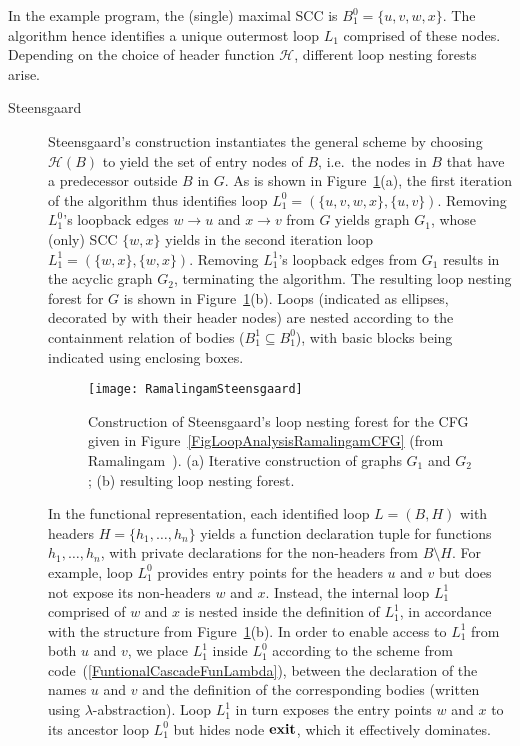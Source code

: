 In the example program, the (single) maximal SCC is $B^0_1 = \{u, v,
w, x\}$.  The algorithm hence identifies a unique outermost loop $L_1$
comprised of these nodes.  Depending on the choice of header function
$\mathcal{H}$, different loop nesting forests arise.

\begin{description}

\item[Steensgaard] Steensgaard's construction instantiates the general
  scheme by choosing $\mathcal{H}(B)$ to yield the set of entry nodes
  of $B$, i.e.~the nodes in $B$ that have a predecessor outside $B$ in
  $G$. As is shown in
  Figure~\ref{FigLoopAnalysisRamalingamSteensgaard}(a), the first
  iteration of the algorithm thus identifies loop $L^0_1=(\{u,v,w,x\},
  \{u,v\})$.  Removing $L^0_1$'s loopback edges $w \to u$ and $x \to
  v$ from $G$ yields graph $G_1$, whose (only) SCC $\{w,x\}$ yields in
  the second iteration loop $L^1_1 = (\{w,x\}, \{w,x\})$.  Removing
  $L^1_1$'s loopback edges from $G_1$ results in the acyclic graph
  $G_2$, terminating the algorithm.  The resulting loop nesting forest
  for $G$ is shown in
  Figure~\ref{FigLoopAnalysisRamalingamSteensgaard}(b).  Loops
  (indicated as ellipses, decorated by with their header nodes) are
  nested according to the containment relation of bodies ($B^1_1
  \subseteq B^0_1$), with basic blocks being indicated using enclosing
  boxes.

  \begin{figure}
    \begin{center}
    \texttt{[image: RamalingamSteensgaard]}
    \end{center}
    \caption{\label{FigLoopAnalysisRamalingamSteensgaard} Construction
       of Steensgaard's loop nesting forest for the CFG given in
       Figure~\ref{FigLoopAnalysisRamalingamCFG} (from
       Ramalingam~\cite{DBLP:journals/toplas/Ramalingam02}). 
       (a) Iterative construction of graphs $G_1$ and $G_2$; 
       (b) resulting loop nesting forest.}
  \end{figure} 

  In the functional representation, each identified loop $L=(B,H)$
  with headers $H=\{h_1,\ldots,h_n\}$ yields a function declaration
  tuple for functions $h_1,\ldots,h_n$, with private declarations for
  the non-headers from $B \setminus H$. For example, loop $L^0_1$
  provides entry points for the headers $u$ and $v$ but does not
  expose its non-headers $w$ and $x$.  Instead, the internal loop
  $L^1_1$ comprised of $w$ and $x$ is nested inside the definition of
  $L^1_1$, in accordance with the structure from
  Figure~\ref{FigLoopAnalysisRamalingamSteensgaard}(b).  In order to
  enable access to $L^1_1$ from both $u$ and $v$, we place $L^1_1$
  inside $L^0_1$ according to the scheme from
  code~(\ref{FuntionalCascadeFunLambda}), between the declaration of
  the names $u$ and $v$ and the definition of the corresponding bodies
  (written using $\lambda$-abstraction). Loop $L^1_1$ in turn exposes
  the entry points $w$ and $x$ to its ancestor loop $L^0_1$ but hides
  node $\mathbf{exit}$, which it effectively dominates.  


\end{description}
